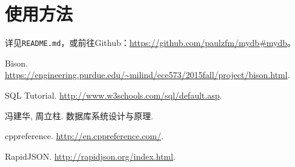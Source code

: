 \documentclass[11pt, a4paper]{article}
\begin{document}
\section{使用方法}

详见\texttt{README.md}，或前往Github：\url{https://github.com/paulzfm/mydb#mydb}。

\renewcommand{\refname}{参考资料}

\begin{thebibliography}{9}

 Bison. \url{https://engineering.purdue.edu/~milind/ece573/2015fall/project/bison.html}.

 SQL Tutorial. \url{http://www.w3schools.com/sql/default.asp}.

 冯建华, 周立柱. 数据库系统设计与原理. 

 cppreference. \url{http://en.cppreference.com/}.

 RapidJSON. \url{http://rapidjson.org/index.html}.

\end{thebibliography}
\end{document}
